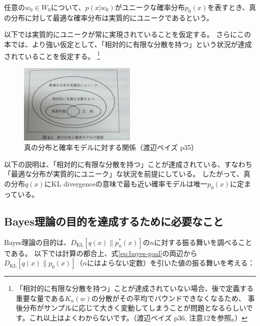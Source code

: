 \documentclass[dvipdfmx]{jsarticle}
\begin{document}
\begin{mybox}[実質的にユニーク]
    任意の$w_0\in W_0$について、$p(x|w_0)$がユニークな確率分布$p_0(x)$を表すとき、真の分布に対して最適な確率分布は実質的にユニークであるという。
\end{mybox}
以下では実質的にユニークが常に実現されていることを仮定する。
さらにこの本では、より強い仮定として、「相対的に有限な分散を持つ」という状況が達成されていることを仮定する。
\footnote{「相対的に有限な分散を持つ」ことが達成されていない場合、後で定義する重要な量である$K_n(w)$の分散がその平均でバウンドできなくなるため、
事後分布がサンプルに応じて大きく変動してしまうことが問題となるらしいです。これ以上はよくわからないです。（渡辺ベイズ p36, 注意12を参照。）}

\begin{figure}[H]
    \centering
    \includegraphics[width=0.5\textwidth]{yuugennnabunsan.jpg}
    \caption{真の分布と確率モデルに対する関係（渡辺ベイズ p35）}
    \label{fig:katei}
\end{figure}
以下の説明は、「相対的に有限な分散を持つ」ことが達成されている、すなわち「最適な分布が実質的にユニーク」な状況を前提にしている。
したがって、真の分布$q(x)$にKL divergenceの意味で最も近い確率モデルは唯一$p_0(x)$に定まっている。

\subsection{Bayes理論の目的を達成するために必要なこと}
Bayes理論の目的は、$D_{\text{KL}}[q(x) \parallel p_n^{*}(x)]$の$n$に対する振る舞いを調べることである。
以下では計算の都合上、式\eqref{eq:bayes-goal}の両辺から$D_{\text{KL}}[q(x) \parallel p_0(x)]$（$n$にはよらない定数）を引いた値の振る舞いを考える：
\end{document}
